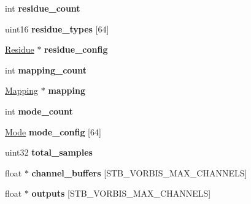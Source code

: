 \begin{DoxyCompactItemize}
\item 
int {\bfseries residue\+\_\+count}\hypertarget{structstb__vorbis_ac2103bb2e30d29b68ba3cd85679b8ac0}{}\label{structstb__vorbis_ac2103bb2e30d29b68ba3cd85679b8ac0}

\item 
uint16 {\bfseries residue\+\_\+types} \mbox{[}64\mbox{]}\hypertarget{structstb__vorbis_ac6bb3f030ccdeacd23ad3bacbdca2a3d}{}\label{structstb__vorbis_ac6bb3f030ccdeacd23ad3bacbdca2a3d}

\item 
\hyperlink{struct_residue}{Residue} $\ast$ {\bfseries residue\+\_\+config}\hypertarget{structstb__vorbis_a5514e4826d244f216448e5c3839c78b2}{}\label{structstb__vorbis_a5514e4826d244f216448e5c3839c78b2}

\item 
int {\bfseries mapping\+\_\+count}\hypertarget{structstb__vorbis_aed8cabfd2e35742f337e6ded1eb26951}{}\label{structstb__vorbis_aed8cabfd2e35742f337e6ded1eb26951}

\item 
\hyperlink{struct_mapping}{Mapping} $\ast$ {\bfseries mapping}\hypertarget{structstb__vorbis_accf685d27ba4ea9f3cab74df173871bc}{}\label{structstb__vorbis_accf685d27ba4ea9f3cab74df173871bc}

\item 
int {\bfseries mode\+\_\+count}\hypertarget{structstb__vorbis_af91c34d59c47301e40a83d9ee1017274}{}\label{structstb__vorbis_af91c34d59c47301e40a83d9ee1017274}

\item 
\hyperlink{struct_mode}{Mode} {\bfseries mode\+\_\+config} \mbox{[}64\mbox{]}\hypertarget{structstb__vorbis_adf9aaee5832e512b5efe0a0d99b02894}{}\label{structstb__vorbis_adf9aaee5832e512b5efe0a0d99b02894}

\item 
uint32 {\bfseries total\+\_\+samples}\hypertarget{structstb__vorbis_ac6b09b0d2d48f1d49cbe0b482daeaead}{}\label{structstb__vorbis_ac6b09b0d2d48f1d49cbe0b482daeaead}

\item 
float $\ast$ {\bfseries channel\+\_\+buffers} \mbox{[}S\+T\+B\+\_\+\+V\+O\+R\+B\+I\+S\+\_\+\+M\+A\+X\+\_\+\+C\+H\+A\+N\+N\+E\+LS\mbox{]}\hypertarget{structstb__vorbis_a55c99dc6b4222ca849a884e9dcef890f}{}\label{structstb__vorbis_a55c99dc6b4222ca849a884e9dcef890f}

\item 
float $\ast$ {\bfseries outputs} \mbox{[}S\+T\+B\+\_\+\+V\+O\+R\+B\+I\+S\+\_\+\+M\+A\+X\+\_\+\+C\+H\+A\+N\+N\+E\+LS\mbox{]}\hypertarget{structstb__vorbis_aca71a981ab130d51a27b30451ac2ae6f}{}\label{structstb__vorbis_aca71a981ab130d51a27b30451ac2ae6f}


\end{DoxyCompactItemize}
